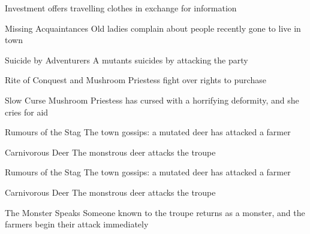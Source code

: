 \begin{multicols}{2}

\resumecontents[Town]
\label{mushroomPriestess}

\noindent

{Investment}%
{ offers travelling clothes in exchange for information}%



{Missing Acquaintances}%
{Old ladies complain about people recently gone to live in town}%


{Suicide by Adventurers}%
{A mutants suicides by attacking the party}%



{Rite of Conquest}%
{ and Mushroom Priestess fight over rights to purchase }%


{Slow Curse}%
{Mushroom Priestess has cursed  with a horrifying deformity, and she cries for aid}%


{Rumours of the Stag}%
{The town gossips: a mutated deer has attacked a farmer}%



{Carnivorous Deer}%
{The monstrous deer attacks the troupe}%



{Rumours of the Stag}%
{The town gossips: a mutated deer has attacked a farmer}%



{Carnivorous Deer}%
{The monstrous deer attacks the troupe}%


{The Monster Speaks}%
{Someone known to the troupe returns as a monster, and the farmers begin their attack immediately}%



\end{multicols}
